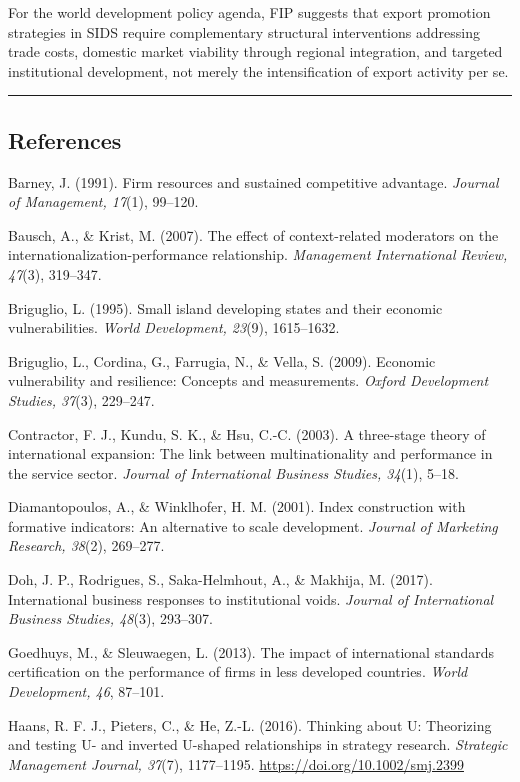 \documentclass[12pt,a4paper]{article}
\begin{document}
For the world development policy agenda, FIP suggests that export
promotion strategies in SIDS require complementary structural
interventions addressing trade costs, domestic market viability through
regional integration, and targeted institutional development, not merely
the intensification of export activity per se.

\begin{center}\rule{0.5\linewidth}{0.5pt}\end{center}

\hypertarget{references}{%
\subsection{References}\label{references}}

Barney, J. (1991). Firm resources and sustained competitive advantage.
\emph{Journal of Management, 17}(1), 99--120.

Bausch, A., \& Krist, M. (2007). The effect of context-related
moderators on the internationalization-performance relationship.
\emph{Management International Review, 47}(3), 319--347.

Briguglio, L. (1995). Small island developing states and their economic
vulnerabilities. \emph{World Development, 23}(9), 1615--1632.

Briguglio, L., Cordina, G., Farrugia, N., \& Vella, S. (2009). Economic
vulnerability and resilience: Concepts and measurements. \emph{Oxford
Development Studies, 37}(3), 229--247.

Contractor, F. J., Kundu, S. K., \& Hsu, C.-C. (2003). A three-stage
theory of international expansion: The link between multinationality and
performance in the service sector. \emph{Journal of International
Business Studies, 34}(1), 5--18.

Diamantopoulos, A., \& Winklhofer, H. M. (2001). Index construction with
formative indicators: An alternative to scale development. \emph{Journal
of Marketing Research, 38}(2), 269--277.

Doh, J. P., Rodrigues, S., Saka-Helmhout, A., \& Makhija, M. (2017).
International business responses to institutional voids. \emph{Journal
of International Business Studies, 48}(3), 293--307.

Goedhuys, M., \& Sleuwaegen, L. (2013). The impact of international
standards certification on the performance of firms in less developed
countries. \emph{World Development, 46}, 87--101.

Haans, R. F. J., Pieters, C., \& He, Z.-L. (2016). Thinking about U:
Theorizing and testing U- and inverted U-shaped relationships in
strategy research. \emph{Strategic Management Journal, 37}(7),
1177--1195. \url{https://doi.org/10.1002/smj.2399}
\end{document}
